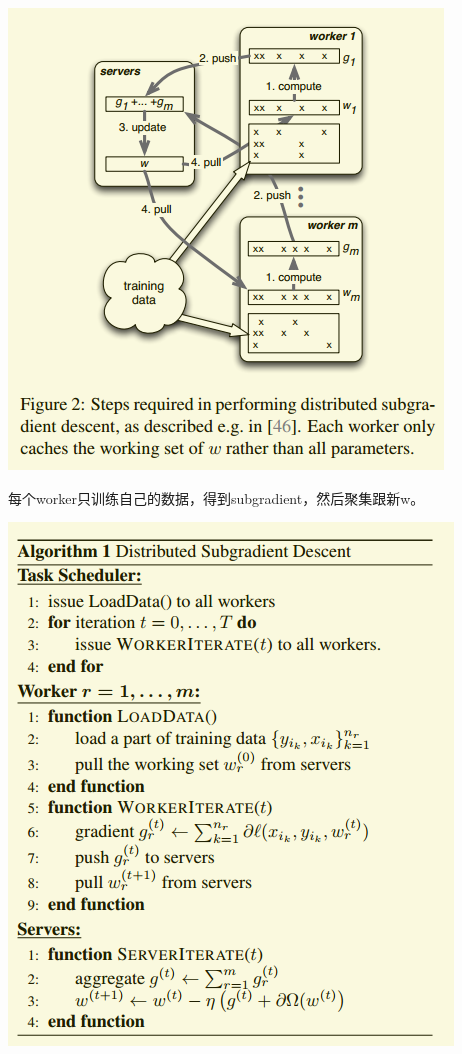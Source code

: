 \documentclass[11pt]{article}
\begin{document}
\begin{center}
\includegraphics[width=.9\linewidth]{PS.org_imgs/20201109_205205_0B2DJo.png}
\end{center}

每个worker只训练自己的数据，得到subgradient，然后聚集跟新w。

\begin{center}
\includegraphics[width=.9\linewidth]{PS.org_imgs/20201109_205231_utqe0Y.png}
\end{center}
\end{document}
